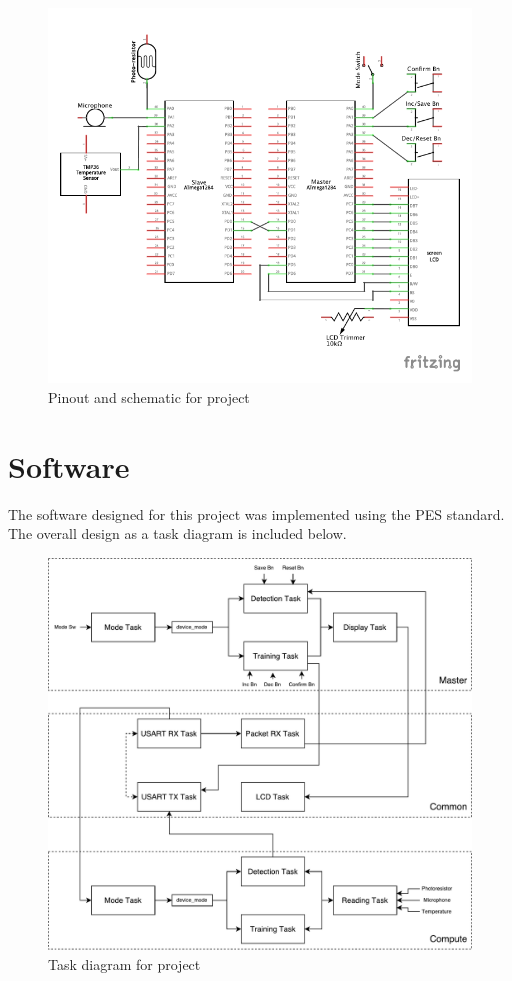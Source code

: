 \documentclass{article}
\begin{document}
\begin{figure}[H]
  \centering
  \noindent\includegraphics[scale=1.10]{pinout}
  \caption{Pinout and schematic for project}
  \label{schematic:1}
\end{figure}

\section{Software}

The software designed for this project was implemented using the PES
standard.  The overall design as a task diagram is included below.

\begin{figure}[H]
  \centering
  \noindent\includegraphics[width = \textwidth]{task_diagram}
  \caption{Task diagram for project}
  \label{task:1}
\end{figure}
\end{document}
